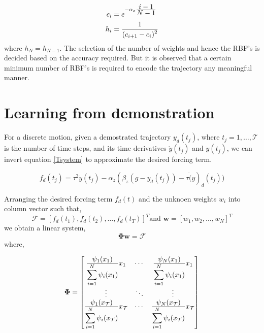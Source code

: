 \begin{align}
    c_i &= e^{-\alpha_x \frac{\displaystyle i-1}{\displaystyle N-1}}\\
    h_i &= \frac{\displaystyle 1}{\displaystyle (c_{i+1} - c_i)^2}
\end{align}
where $h_N = h_{N-1}$. The selection of the number of weights and hence the RBF's is decided based on the accuracy required.
But it is observed that a certain minimum number of RBF's is required to encode the trajectory any meaningful manner\cite{saveriano2021dynamic}.

\section{Learning from demonstration}
For a discrete motion, given a demostrated trajectory $y_d(t_j)$, where $t_j = 1, \dots , \mathcal{T}$ is the number of time steps, and 
its time derivatives $\dot{y}(t_j)$ and $\ddot{y}(t_j)$, we can invert equation \eqref{Tsystem} to approximate
the desired forcing term.

\begin{equation}
    f_d(t_j) = \tau^2 \ddot{y}(t_j) - \alpha_z (\beta_z (g - y_d(t_j))  - \tau \dot(y)_d(t_j)) \label{inverseDMP}
\end{equation}

Arranging the desired forcing term $f_d(t)$ and the unknoen weights $w_i$ into column vector such that, 
\[ 
 \bm{\mathcal{F}} = \left[ f_d(t_1), f_d(t_2), \dots , f_d(t_T) \right]^T 
    \text{and  }   \boldsymbol{w} = \left[ w_1, w_2, \dots , w_N \right]^T  
        \]
we obtain a linear system, 
\begin{equation}
    \boldsymbol{\Phi} \boldsymbol{w} = \bm{\mathcal{F}}
\end{equation}
where,

\begin{equation}
\boldsymbol{\Phi} = 
\begin{bmatrix}
 \frac{\displaystyle \psi_1(x_1)}{\displaystyle \sum\limits_{i=1}^{N} \psi_i(x_1)}x_1 & \cdots & \frac{\displaystyle \psi_N(x_1)}{\displaystyle \sum\limits_{i=1}^{N} \psi_i(x_1)}x_1 \\
\vdots & \ddots & \vdots \\
\frac{\displaystyle \psi_1(x_\mathcal{T})}{\displaystyle \sum\limits_{i=1}^{N} \psi_i(x_\mathcal{T})}x_\mathcal{T} & \cdots & \frac{\displaystyle \psi_N(x_\mathcal{T})}{\displaystyle \sum\limits_{i=1}^{N} \psi_i(x_\mathcal{T})}x_\mathcal{T} 
               
\end{bmatrix}
\end{equation}

